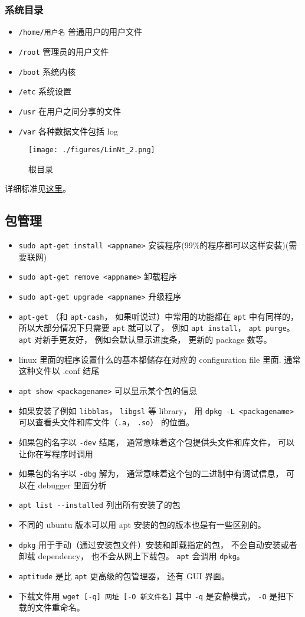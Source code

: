 \subsubsection{系统目录}
\begin{itemize}
\item \verb|/home/用户名| 普通用户的用户文件
\item \verb|/root| 管理员的用户文件
\item \verb|/boot| 系统内核
\item \verb|/etc| 系统设置
\item \verb|/usr| 在用户之间分享的文件
\item \verb|/var| 各种数据文件包括 log
\end{itemize}
\begin{figure}[ht]
\centering
\texttt{[image: ./figures/LinNt\_2.png]}
\caption{根目录} \label{LinNt_fig2}
\end{figure}
详细标准见\href{https://www.pathname.com/fhs/}{这里}。

\subsection{包管理}
\begin{itemize}
\item \verb`sudo apt-get install <appname>` 安装程序(99\%的程序都可以这样安装)(需要联网)
\item \verb`sudo apt-get remove <appname>` 卸载程序
\item \verb`sudo apt-get upgrade <appname>` 升级程序
\item \verb`apt-get` （和 \verb`apt-cash`， 如果听说过）中常用的功能都在 \verb`apt` 中有同样的， 所以大部分情况下只需要 \verb`apt` 就可以了， 例如 \verb`apt install`， \verb`apt purge`。 \verb`apt` 对新手更友好， 例如会默认显示进度条， 更新的 package 数等。
\item linux 里面的程序设置什么的基本都储存在对应的 configuration file 里面. 通常这种文件以 .conf 结尾
\item \verb`apt show <packagename>` 可以显示某个包的信息
\item 如果安装了例如 \verb`libblas`， \verb`libgsl` 等 library， 用 \verb`dpkg -L <packagename>` 可以查看头文件和库文件（\verb`.a`， \verb`.so`） 的位置。
\item 如果包的名字以 \verb`-dev` 结尾， 通常意味着这个包提供头文件和库文件， 可以让你在写程序时调用
\item 如果包的名字以 \verb`-dbg` 解为， 通常意味着这个包的二进制中有调试信息， 可以在 debugger 里面分析
\item \verb|apt list --installed| 列出所有安装了的包
\item 不同的 ubuntu 版本可以用 apt 安装的包的版本也是有一些区别的。
\item \verb|dpkg| 用于手动（通过安装包文件）安装和卸载指定的包， 不会自动安装或者卸载 dependency， 也不会从网上下载包。 \verb|apt| 会调用 \verb|dpkg|。
\item \verb|aptitude| 是比 \verb|apt| 更高级的包管理器， 还有 GUI 界面。
\item 下载文件用 \verb|wget [-q] 网址 [-O 新文件名]| 其中 \verb|-q| 是安静模式， \verb|-O| 是把下载的文件重命名。
\end{itemize}

